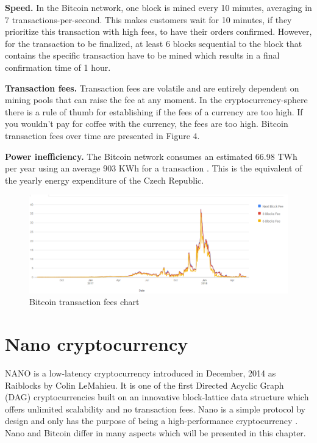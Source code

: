 \documentclass{ferseminar}
\begin{document}
\textbf{Speed.} In the Bitcoin network, one block is mined every 10 minutes, averaging in 7 transactions-per-second. This makes customers wait for 10 minutes, if they prioritize this transaction with high fees, to have their orders confirmed. However, for the transaction to be finalized, at least 6 blocks sequential to the block that contains the specific transaction have to be mined which results in a final confirmation time of 1 hour.

\textbf{Transaction fees.} Transaction fees are volatile and are entirely dependent on mining pools that can raise the fee at any moment. In the cryptocurrency-sphere there is a rule of thumb for establishing if the fees of a currency are too high. If you wouldn't pay for coffee with the currency, the fees are too high. Bitcoin transaction fees over time are presented in Figure 4.

\textbf{Power inefficiency.} The Bitcoin network consumes an estimated 66.98 TWh per year using an average 903 KWh for a transaction \cite{struja}. This is the equivalent of the yearly energy expenditure of the Czech Republic.

\begin{figure}[ht]
	\caption{Bitcoin transaction fees chart \cite{fees}}
	\includegraphics[scale=0.5]{btcfee}
	\centering
\end{figure}
\FloatBarrier

\section{Nano cryptocurrency}

NANO is a low-latency cryptocurrency introduced in December, 2014 as Raiblocks by Colin LeMahieu. It is one of the first Directed Acyclic Graph (DAG) cryptocurrencies built on an innovative block-lattice data structure which offers unlimited scalability and no transaction fees. Nano is a simple protocol by design and only has the purpose of being a high-performance cryptocurrency \cite{Nano}. Nano and Bitcoin differ in many aspects which will be presented in this chapter.
\end{document}
